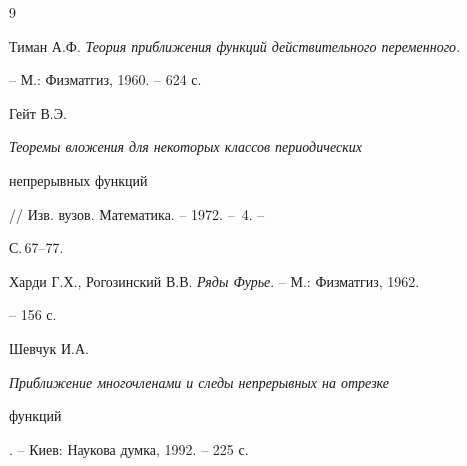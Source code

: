 \begin{thebibliography}{9} 


 




Тиман А.Ф. {\em Теория приближения функций действительного переменного}. 


-- М.: Физматгиз, 1960. -- 624 с. 




Гейт В.Э. {\em Теоремы вложения для некоторых классов периодических 


непрерывных функций} // Изв. вузов. Математика. -- 1972. -- \No\,4. -- 


С.\,67--77. 




Харди Г.Х., Рогозинский В.В. {\em Ряды Фурье}. -- М.: Физматгиз, 1962. 


-- 156 с. 




Шевчук И.А. {\em Приближение многочленами и следы непрерывных на отрезке 


функций}. -- Киев: Наукова думка, 1992. -- 225 с. 


 


\end{thebibliography} 


 


\vskip 2cm 


 






 


\label{end} 


 


